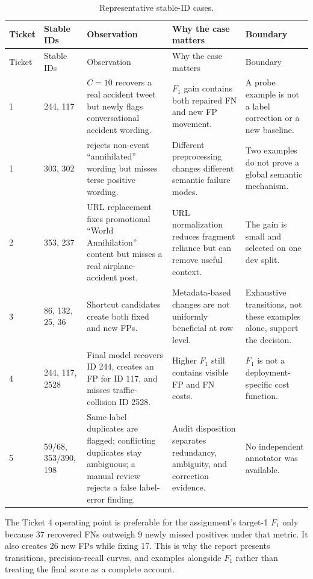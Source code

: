 \documentclass[10pt]{article}
\newcommand{\code}[1]{\texttt{\detokenize{#1}}}
\newcommand{\fscore}{\ensuremath{F_1}}
\begin{document}
\small
\begin{longtable}{p{} p{} p{} p{} p{}}
\caption{Representative stable-ID cases.}\label{tab:cases} \\
\toprule
Ticket & Stable IDs & Observation & Why the case matters & Boundary \\
\midrule
\endfirsthead
\toprule
Ticket & Stable IDs & Observation & Why the case matters & Boundary \\
\midrule
\endhead
1 & 244, 117 & $C=10$ recovers a real accident tweet but newly flags conversational accident wording. & \fscore{} gain contains both repaired FN and new FP movement. & A probe example is not a label correction or a new baseline. \\
1 & 303, 302 & \code{norm=None} rejects non-event ``annihilated'' wording but misses terse positive wording. & Different preprocessing changes different semantic failure modes. & Two examples do not prove a global semantic mechanism. \\
2 & 353, 237 & URL replacement fixes promotional ``World Annihilation'' content but misses a real airplane-accident post. & URL normalization reduces fragment reliance but can remove useful context. & The gain is small and selected on one dev split. \\
3 & 86, 132, 25, 36 & Shortcut candidates create both fixed and new FPs. & Metadata-based changes are not uniformly beneficial at row level. & Exhaustive transitions, not these examples alone, support the decision. \\
4 & 244, 117, 2528 & Final model recovers ID 244, creates an FP for ID 117, and misses traffic-collision ID 2528. & Higher \fscore{} still contains visible FP and FN costs. & \fscore{} is not a deployment-specific cost function. \\
5 & 59/68, 353/390, 198 & Same-label duplicates are flagged; conflicting duplicates stay ambiguous; a manual review rejects a false label-error finding. & Audit disposition separates redundancy, ambiguity, and correction evidence. & No independent annotator was available. \\
\bottomrule
\end{longtable}
\normalsize

The Ticket 4 operating point is preferable for the assignment's target-1 \fscore{} only because 37 recovered FNs outweigh 9 newly missed positives under that metric. It also creates 26 new FPs while fixing 17. This is why the report presents transitions, precision-recall curves, and examples alongside \fscore{} rather than treating the final score as a complete account.
\end{document}

